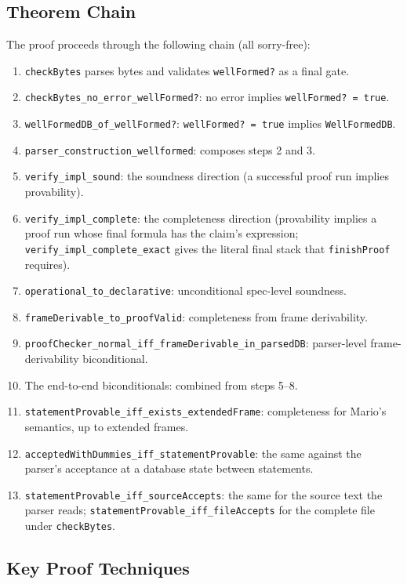 \documentclass[11pt]{article}
\newcommand{\lean}[1]{\lstinline[language=Lean4]{#1}}
\begin{document}
\subsection{Theorem Chain}

The proof proceeds through the following chain (all sorry-free):

\begin{enumerate}[leftmargin=2em]
\item \lean{checkBytes} parses bytes and validates \lean{wellFormed?}
  as a final gate.
\item \lean{checkBytes_no_error_wellFormed?}: no error implies
  \lean{wellFormed? = true}.
\item \lean{wellFormedDB_of_wellFormed?}: \lean{wellFormed? = true}
  implies \lean{WellFormedDB}.
\item \lean{parser_construction_wellformed}: composes steps 2 and 3.
\item \lean{verify_impl_sound}: the soundness direction
  (a successful proof run implies provability).
\item \lean{verify_impl_complete}: the completeness direction
  (provability implies a proof run whose final formula has the claim's
  expression; \lean{verify_impl_complete_exact} gives the literal final
  stack that \lean{finishProof} requires).
\item \lean{operational_to_declarative}: unconditional spec-level soundness.
\item \lean{frameDerivable_to_proofValid}: completeness from frame
  derivability.
\item \lean{proofChecker_normal_iff_frameDerivable_in_parsedDB}:
  parser-level frame-derivability biconditional.
\item The end-to-end biconditionals: combined from steps 5--8.
\item \lean{statementProvable_iff_exists_extendedFrame}: completeness for
  Mario's semantics, up to extended frames.
\item \lean{acceptedWithDummies_iff_statementProvable}: the same against
  the parser's acceptance at a database state between statements.
\item \lean{statementProvable_iff_sourceAccepts}: the same for the source
  text the parser reads; \lean{statementProvable_iff_fileAccepts} for the
  complete file under \lean{checkBytes}.
\end{enumerate}

\subsection{Key Proof Techniques}
\end{document}
